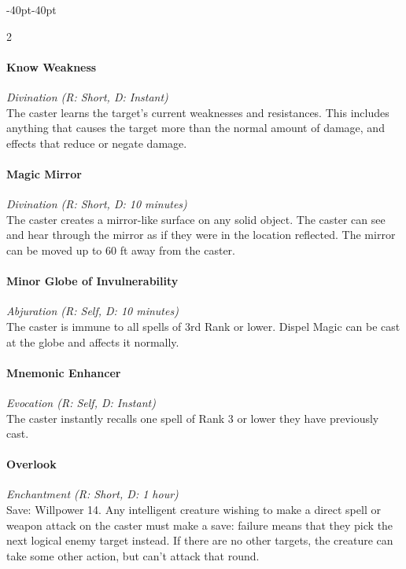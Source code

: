 \documentclass{book}
\begin{document}
\begin{adjustwidth}{-40pt}{-40pt}
\begin{multicols}{2}
\paragraph{Know Weakness}\label{know-weakness}

\emph{Divination (R: Short, D: Instant)}\\
The caster learns the target's current weaknesses and resistances. This
includes anything that causes the target more than the normal amount of
damage, and effects that reduce or negate damage.

\paragraph{Magic Mirror}\label{magic-mirror}

\emph{Divination (R: Short, D: 10 minutes)}\\
The caster creates a mirror-like surface on any solid object. The caster
can see and hear through the mirror as if they were in the location
reflected. The mirror can be moved up to 60 ft away from the caster.

\paragraph{Minor Globe of
	Invulnerability}\label{minor-globe-of-invulnerability}

\emph{Abjuration (R: Self, D: 10 minutes)}\\
The caster is immune to all spells of 3rd Rank or lower. Dispel Magic
can be cast at the globe and affects it normally.

\paragraph{Mnemonic Enhancer}\label{mnemonic-enhancer}

\emph{Evocation (R: Self, D: Instant)}\\
The caster instantly recalls one spell of Rank 3 or lower they have
previously cast.

\paragraph{Overlook}\label{overlook}

\emph{Enchantment (R: Short, D: 1 hour)}\\
Save: Willpower 14. Any intelligent creature wishing to make a direct
spell or weapon attack on the caster must make a save: failure means
that they pick the next logical enemy target instead. If there are no
other targets, the creature can take some other action, but can't attack
that round.


\end{multicols}
\end{adjustwidth}
\end{document}
